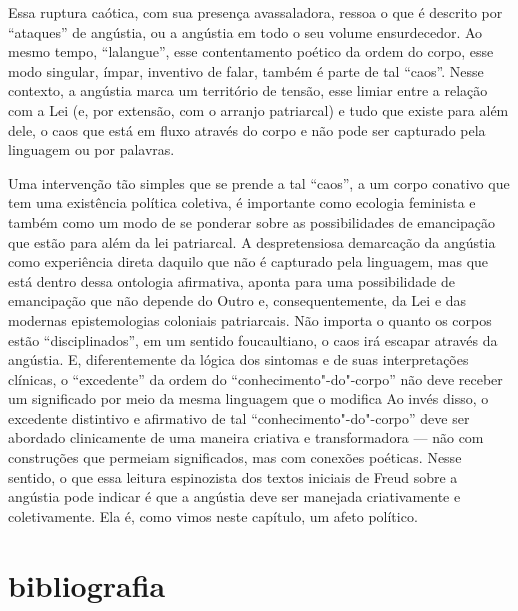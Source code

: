 Essa ruptura caótica, com sua presença avassaladora, ressoa o que é
descrito por ``ataques'' de angústia, ou a angústia em todo o seu volume
ensurdecedor. Ao mesmo tempo, ``lalangue'', esse contentamento poético
da ordem do corpo, esse modo singular, ímpar, inventivo de falar, também
é parte de tal ``caos''. Nesse contexto, a angústia marca um território
de tensão, esse limiar entre a relação com a Lei (e, por extensão, com o
arranjo patriarcal) e tudo que existe para além dele, o caos que está em
fluxo através do corpo e não pode ser capturado pela linguagem ou por
palavras.

Uma intervenção tão simples que se prende a tal ``caos'', a um corpo
conativo que tem uma existência política coletiva, é importante como
ecologia feminista e também como um modo de se ponderar sobre as
possibilidades de emancipação que estão para além da lei patriarcal. A
despretensiosa demarcação da angústia como experiência direta daquilo
que não é capturado pela linguagem, mas que está dentro dessa ontologia
afirmativa, aponta para uma possibilidade de emancipação que não depende
do Outro e, consequentemente, da Lei e das modernas epistemologias
coloniais patriarcais. Não importa o quanto os corpos estão
``disciplinados'', em um sentido foucaultiano, o caos irá escapar
através da angústia. E, diferentemente da lógica dos sintomas e de suas
interpretações clínicas, o ``excedente'' da ordem do
``conhecimento"-do"-corpo'' não deve receber um significado por meio da
mesma linguagem que o modifica Ao invés disso, o excedente distintivo e
afirmativo de tal ``conhecimento"-do"-corpo'' deve ser abordado
clinicamente de uma maneira criativa e transformadora --- não com
construções que permeiam significados, mas com conexões poéticas. Nesse
sentido, o que essa leitura espinozista dos textos iniciais de Freud
sobre a angústia pode indicar é que a angústia deve ser manejada
criativamente e coletivamente. Ela é, como vimos neste capítulo, um
afeto político.

\pagebreak

\section{bibliografia}

